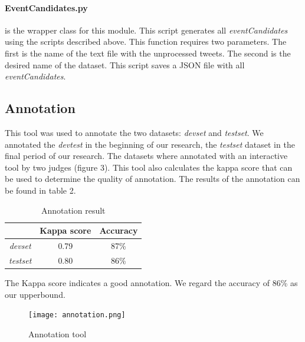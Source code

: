 \documentclass[
10pt, %
a4paper, %
oneside, %
headinclude,footinclude, %
BCOR5mm, %
]{scrartcl}
\begin{document}
\paragraph{EventCandidates.py} is the wrapper class for this module. This script generates all \textit{eventCandidates} using the scripts described above. This function requires two parameters. The first is the name of the text file with the unprocessed tweets. The second is the desired name of the dataset. This script saves a JSON file with all \textit{eventCandidates}.
\newpage
\subsection{Annotation}
This tool was used to annotate the two datasets: \textit{devset} and \textit{testset}. We annotated the \textit{devtest} in the beginning of our research, the \textit{testset} dataset in the final period of our research. The datasets where annotated with an interactive tool by two judges (figure 3). This tool also calculates the kappa score that can be used to determine the quality of annotation. The results of the annotation can be found in table 2. 

\begin{table}[h]
\caption[Annotation result]{Annotation result }
\begin{tabular}{|c|c|c|}
\hline
              & Kappa score & Accuracy \\ \hline
{\it devset}  & 0.79  & 87\%     \\ \hline
{\it testset} & 0.80  & 86\%     \\ \hline
\end{tabular}
\end{table}

The Kappa score indicates a good annotation. We regard the accuracy of 86\% as our upperbound.


\begin{figure}[htbp] %
   \centering
   \texttt{[image: annotation.png]} 
   \caption{Annotation tool}
   \label{fig:annotation}
\end{figure}
\end{document}
